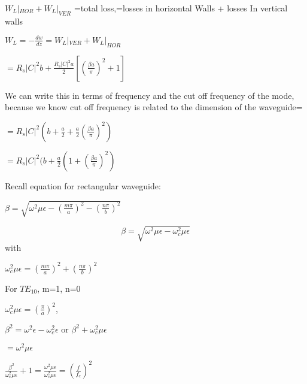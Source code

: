 $W_L|_{HOR} + W_L|_{VER}$ =total loss,=losses in horizontal Walls + losses In vertical walls
\begin{center}
	$W_L=-\frac{dw}{dz}=W_L|_{VER}+W_L|_{HOR}$	
\end{center}
\begin{center}
	$=R_s|C|^2b+\frac{R_s|C|^2a}{2}[(\frac{\beta a}{\pi})^2+1]$	
\end{center}



We can write this in terms of frequency and the cut off frequency of the mode, because we know cut off frequency  is related to the dimension of the waveguide=
\begin{center}
	$=R_s|C|^2 (b + \frac{a}{2} + \frac{a}{2}(\frac{\beta a}{\pi})^2)$	
\end{center}

\begin{center}
	$ =R_s|C|^2(b+\frac{a}{2}(1+(\frac{\beta a}{\pi})^2)$	
\end{center}


Recall equation for rectangular waveguide:  
\begin{center}
	$\beta=\sqrt{{\omega}^2\mu\epsilon-(\frac{m\pi}{a})^2-(\frac{n\pi}{b})^2}$	
\end{center}


\begin{equation}
\beta = \sqrt{\omega^{2} \mu\epsilon-\omega_c^{2} \mu\epsilon}
\end{equation}
with
\begin{center}
	$\omega_c^2\mu\epsilon=(\frac{m\pi}{a})^2+(\frac{n\pi}{b})^2$	
\end{center}



For $TE_{10}$, m=1, n=0
\begin{center}
	$\omega_c^2\mu\epsilon=(\frac{\pi}{a})^2$,	
\end{center}

\begin{center}
	$\beta^2=\omega^2\epsilon-\omega_c^2\epsilon$  or  $\beta^2 + \omega_c^2\mu\epsilon$	
\end{center}


\begin{center}
	$= \omega^2\mu\epsilon$	
\end{center}


\begin{center}
	$\frac{\beta^2}{\omega_c^2\mu\epsilon}+1=\frac{\omega^2\mu\epsilon}{\omega_c^2\mu\epsilon}=(\frac{f}{f_c})^2$	
\end{center}

